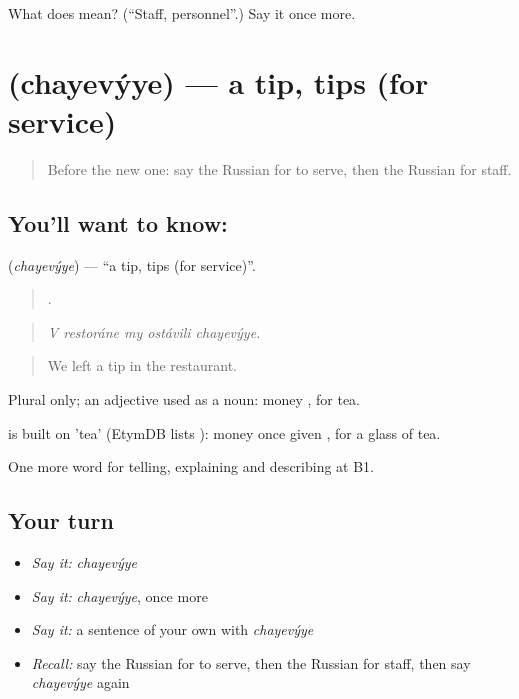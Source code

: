 \begin{tcolorbox}[breakable,colback=teal!4,colframe=teal!35!black,title={Before you move on}]
What does  mean? (\textquotedblleft{}Staff, personnel\textquotedblright{}.) Say it once more.
\end{tcolorbox}
\section[\texorpdfstring{\ru{чаевые} (chayevýye)}{чаевые (chayevýye)}]{ (chayevýye) — a tip, tips (for service)}

\label{lesson:RU-C435-chayevyye}



\begin{quote}
Before the new one: say the Russian for to serve, then the Russian for staff.
\end{quote}

\subsection*{You'll want to know: }
\textbf{} (\emph{chayevýye}) — \textquotedblleft{}a tip, tips (for service)\textquotedblright{}.

\begin{quote}
    .
\end{quote}

\begin{quote}
\emph{V restoráne my ostávili chayevýye.}
\end{quote}

\begin{quote}
We left a tip in the restaurant.
\end{quote}

Plural only; an adjective used as a noun: money \emph{ }, for tea.

\begin{cousinweb}
\emph{} is built on \emph{} 'tea' (EtymDB lists \emph{}): money once given \emph{ }, for a glass of tea.
\end{cousinweb}

\begin{grammarlens}[title={What you've built}]
One more word for telling, explaining and describing at B1.
\end{grammarlens}

\subsection*{Your turn}
\begin{itemize}
\raggedright
  \item \emph{Say it:} \emph{chayevýye}
  \item \emph{Say it:} \emph{chayevýye}, once more
  \item \emph{Say it:} a sentence of your own with \emph{chayevýye}
  \item \emph{Recall:} say the Russian for to serve, then the Russian for staff, then say \emph{chayevýye} again
\end{itemize}

